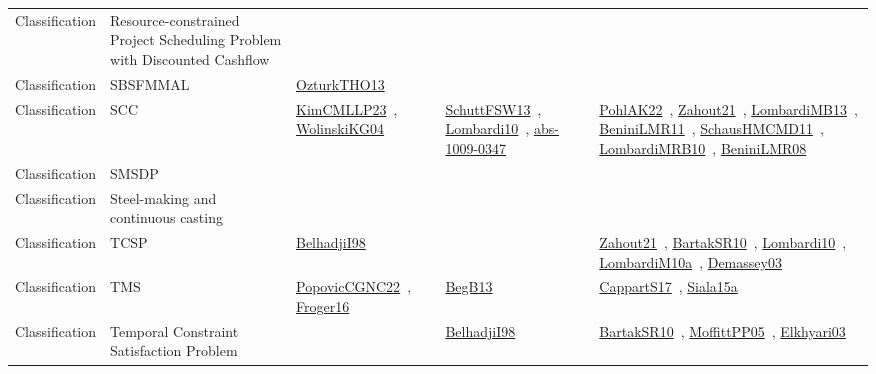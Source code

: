 {\begin{longtable}{lp{3cm}>{\raggedright\arraybackslash}p{6cm}>{\raggedright\arraybackslash}p{6cm}>{\raggedright\arraybackslash}p{8cm}}
Classification & Resource-constrained Project Scheduling Problem with Discounted Cashflow &  &  & \\
Classification & SBSFMMAL & \href{works/OzturkTHO13.pdf}{OzturkTHO13}~\cite{OzturkTHO13} &  & \\
Classification & SCC & \href{works/KimCMLLP23.pdf}{KimCMLLP23}~\cite{KimCMLLP23}, \href{works/WolinskiKG04.pdf}{WolinskiKG04}~\cite{WolinskiKG04} & \href{works/SchuttFSW13.pdf}{SchuttFSW13}~\cite{SchuttFSW13}, \href{works/Lombardi10.pdf}{Lombardi10}~\cite{Lombardi10}, \href{works/abs-1009-0347.pdf}{abs-1009-0347}~\cite{abs-1009-0347} & \href{works/PohlAK22.pdf}{PohlAK22}~\cite{PohlAK22}, \href{works/Zahout21.pdf}{Zahout21}~\cite{Zahout21}, \href{works/LombardiMB13.pdf}{LombardiMB13}~\cite{LombardiMB13}, \href{works/BeniniLMR11.pdf}{BeniniLMR11}~\cite{BeniniLMR11}, \href{works/SchausHMCMD11.pdf}{SchausHMCMD11}~\cite{SchausHMCMD11}, \href{works/LombardiMRB10.pdf}{LombardiMRB10}~\cite{LombardiMRB10}, \href{works/BeniniLMR08.pdf}{BeniniLMR08}~\cite{BeniniLMR08}\\
Classification & SMSDP &  &  & \\
Classification & Steel-making and continuous casting &  &  & \\
Classification & TCSP & \href{works/BelhadjiI98.pdf}{BelhadjiI98}~\cite{BelhadjiI98} &  & \href{works/Zahout21.pdf}{Zahout21}~\cite{Zahout21}, \href{works/BartakSR10.pdf}{BartakSR10}~\cite{BartakSR10}, \href{works/Lombardi10.pdf}{Lombardi10}~\cite{Lombardi10}, \href{works/LombardiM10a.pdf}{LombardiM10a}~\cite{LombardiM10a}, \href{works/Demassey03.pdf}{Demassey03}~\cite{Demassey03}\\
Classification & TMS & \href{works/PopovicCGNC22.pdf}{PopovicCGNC22}~\cite{PopovicCGNC22}, \href{works/Froger16.pdf}{Froger16}~\cite{Froger16} & \href{works/BegB13.pdf}{BegB13}~\cite{BegB13} & \href{works/CappartS17.pdf}{CappartS17}~\cite{CappartS17}, \href{works/Siala15a.pdf}{Siala15a}~\cite{Siala15a}\\
Classification & Temporal Constraint Satisfaction Problem &  & \href{works/BelhadjiI98.pdf}{BelhadjiI98}~\cite{BelhadjiI98} & \href{works/BartakSR10.pdf}{BartakSR10}~\cite{BartakSR10}, \href{works/MoffittPP05.pdf}{MoffittPP05}~\cite{MoffittPP05}, \href{works/Elkhyari03.pdf}{Elkhyari03}~\cite{Elkhyari03}\\

\end{longtable}}
